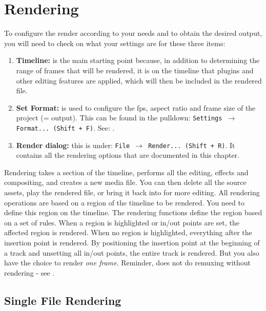 \chapter{Rendering}%
\label{cha:rendering}

To configure the render according to your needs and to obtain the desired output, you will need to check on what your settings are for these three items:

\begin{enumerate}
	\item \textbf{Timeline:} is the main starting point because, in addition to determining the range of frames that will be rendered, it is on the timeline that plugins and other editing features are applied, which will then be included in the rendered file. 
	\item \textbf{Set Format:} is used to configure the fps, aspect ratio and frame size of the project	(= output). This can be found in the pulldown: \texttt{Settings $\rightarrow$ Format... (Shift + F)}.
	See: .
	\item \textbf{Render dialog:} this is under: \texttt{File $\rightarrow$ Render... (Shift + R)}. It contains all the rendering options that are documented in this chapter.
\end{enumerate}

Rendering takes a section of the timeline,  performs all the editing,
effects and compositing, and creates a new media file.  You can then
delete all the source assets, play the rendered file, or bring it
back into \CGG{} for more editing.  All rendering operations are
based on a region of the timeline to be rendered.  You need to
define this region on the timeline.  The rendering functions define
the region based on a set of rules.  When a region is highlighted or
in/out points are set, the affected region is rendered.  When no
region is highlighted, everything after the insertion point is
rendered.  By positioning the insertion point at the beginning of a
track and unsetting all in/out points, the entire track is rendered.
But you also have the choice to render \textit{one frame}. Reminder,
\CGG{} does not do remuxing without rendering - see .

\section{Single File Rendering}%
\label{sec:single_file_rendering}

